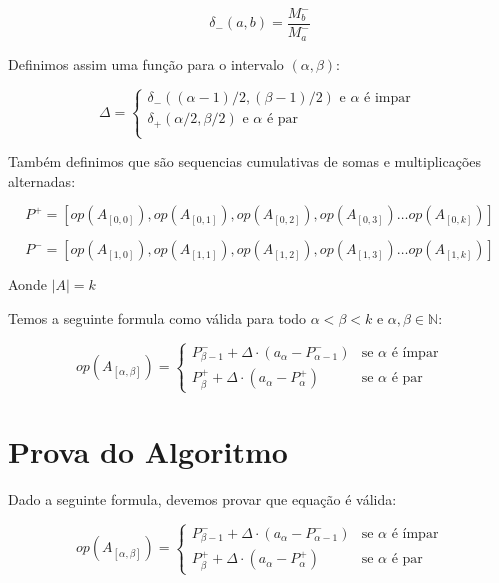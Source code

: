 \documentclass{article}
\begin{document}
\begin{equation*}
\delta_{-}(a, b) = \frac{M_{b}^{-}}{M_{a}^{-}}
\end{equation*}

Definimos assim uma função para o intervalo $(\alpha, \beta)$:

\begin{equation*}
\Delta = \begin{cases}
\delta_{-}((\alpha - 1)/2, (\beta - 1)/2) \text{ e } \alpha \text{ é impar } \\
\delta_{+}(\alpha/2, \beta/2) \text{ e } \alpha \text{ é par } \\
\end{cases}
\end{equation*}

Também definimos que são sequencias cumulativas de somas e multiplicações alternadas:

\begin{equation*}
P^{+} = [ op(A_{[0,0]}), op(A_{[0,1]}), op(A_{[0,2]}), op(A_{[0,3]}) \dots op(A_{[0,k]})]
\end{equation*}

\begin{equation*}
P^{-} = [ op(A_{[1,0]}), op(A_{[1,1]}), op(A_{[1,2]}), op(A_{[1,3]}) \dots op(A_{[1,k]})]
\end{equation*}

Aonde $|A|=k$

Temos a seguinte formula como válida para todo $\alpha < \beta < k$ e $\alpha, \beta \in \mathbb{N}$:

\begin{equation*}
op(A_{[\alpha, \beta]}) = \begin{cases}
P^{-}_{\beta-1} + \Delta \cdot (a_\alpha - P^{-}_{\alpha-1}) & \text{se } \alpha \text{ é ímpar} \\
P^{+}_{\beta} + \Delta \cdot (a_\alpha - P^{+}_{\alpha}) & \text{se } \alpha \text{ é par}
\end{cases}
\end{equation*}

\section{Prova do Algoritmo}

Dado a seguinte formula, devemos provar que equação é válida:

\begin{equation*}
op(A_{[\alpha, \beta]}) = \begin{cases}
P^{-}_{\beta-1} + \Delta \cdot (a_\alpha - P^{-}_{\alpha-1}) & \text{se } \alpha \text{ é ímpar} \\
P^{+}_{\beta} + \Delta \cdot (a_\alpha - P^{+}_{\alpha}) & \text{se } \alpha \text{ é par}
\end{cases}
\end{equation*}
\end{document}
